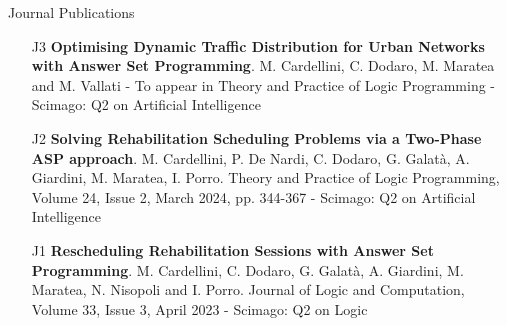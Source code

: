 \documentclass{resume} %
\begin{document}

\begin{rSection}{Journal Publications}
\begin{enumerate}[leftmargin=5mm]
	\item[J3] \textbf{Optimising Dynamic Traffic Distribution for Urban Networks with Answer Set Programming}. M. Cardellini, C. Dodaro, M. Maratea and M. Vallati - To appear in Theory and Practice of Logic Programming - Scimago: Q2 on Artificial Intelligence
	\item[J2] \textbf{Solving Rehabilitation Scheduling Problems via a Two-Phase ASP approach}. M. Cardellini, P. De Nardi, C. Dodaro, G. Galat\`a, A. Giardini, M. Maratea, I. Porro. Theory and Practice of Logic Programming, Volume 24, Issue 2, March 2024, pp. 344-367 - Scimago: Q2 on Artificial Intelligence
	\item[J1] \textbf{Rescheduling Rehabilitation Sessions with Answer Set Programming}. M. Cardellini, C. Dodaro, G. Galat\`a, A. Giardini, M. Maratea, N. Nisopoli and I. Porro. Journal of Logic and Computation, Volume 33, Issue 3, April 2023 - Scimago: Q2 on Logic
\end{enumerate}
\end{rSection}
\end{document}

